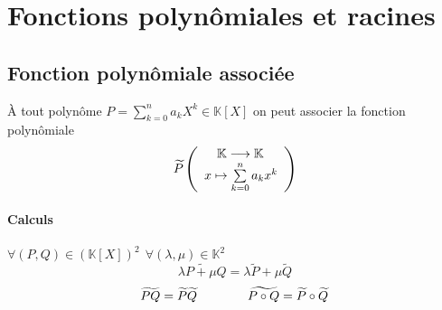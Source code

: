 	\section{Fonctions polynômiales et racines}
		\subsection{Fonction polynômiale associée}
			À tout polynôme $P = \sum\limits_{k=0}^n a_k X^k \in \mathbb{K} [X]$ on peut associer 
			la fonction polynômiale 
			\[\widetilde{P} \left( \begin{array}{l}
			\hspace*{10pt}\mathbb{K} \longrightarrow \mathbb{K} \\
			x \mapsto \sum\limits_{k=0}^n a_k x^k \end{array} \right)\]
			\paragraph{Calculs}
				$\forall (P,Q)\in (\mathbb{K} [X])^2 ~~ \forall (\lambda ,\mu )\in\mathbb{K}^2$
				\[\widetilde{\lambda P+\mu Q} = \lambda\widetilde{P} +\mu\widetilde{Q}\]
				\[\widetilde{PQ} = \widetilde{P}\widetilde{Q} \hspace*{40pt} \widetilde{P\circ Q} 
				= \widetilde{P}\circ\widetilde{Q}\]

